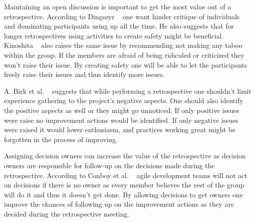 \documentclass[12pt]{article}
\begin{document}
\begin{table}[!h]
	\centering
	\captionsetup{justification=centering}
	\caption{Different considerations during the retrospective}
	\label{table:pitfalls}
\end{table}

Maintaining an open discussion is important to get the most value out of a retrospective. According to Dingsøyr ~\cite{Dingsoyr2005} one want hinder critique of individuals and dominating participants using up all the time. He also suggests that for longer retrospectives using activities to create safety might be beneficial. Kinoshita ~\cite{Kinoshita2008} also raises the same issue by recommending not making any taboo within the group. If the members are afraid of being ridiculed or criticized they won't raise their issue. By creating safety one will be able to let the participants freely raise their issues and thus identify more issues. 

A. Birk et al. ~\cite{Birk2002} suggests that while performing a retrospective one shouldn't limit experience gathering to the project's negative aspects. One should also identify the positive aspects as well or they might go unnoticed. If only positive issues were raise no improvement actions would be identified. If only negative issues were raised it would lower enthusiasm, and practices working great might be forgotten in the process of improving. 

\label{par:assign-decision-owners} Assigning decision owners can increase the value of the retrospective as decision owners are responsible for follow-up on the decisions made during the retrospective. According to Conboy et al. ~\cite{Drury2012} agile development teams will not act on decisions if there is no owner as every member believes the rest of the group will do it and thus it doesn't get done. By allowing decisions to get owners one improve the chances of following up on the improvement actions as they are decided during the retrospective meeting. 
\end{document}
